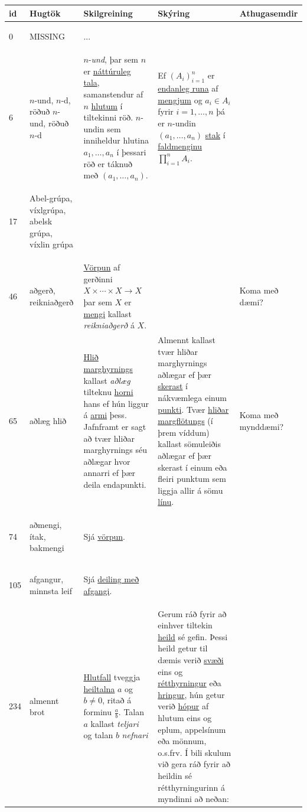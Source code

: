 \begin{longtable}{p{} | p{} | p{} | p{} | p{}}
\hline
\textbf{id} & \textbf{Hugtök} & \textbf{Skilgreining} & \textbf{Skýring} & \textbf{Athugasemdir} \\
\hline
0 & \hypertarget{row:0}{MISSING} & ... &  &  \\
\hline
6 & \hypertarget{row:6}{\(n\)-und, \(n\)-d, röðuð \(n\)-und, röðuð \hbox{\(n\)-d}} & \(n\)-\textit{und}, þar sem \(n\) er \hyperlink{row:3475}{náttúruleg tala}, samanstendur af \(n\) \hyperlink{row:2123}{hlutum} í tiltekinni röð. \(n\)-undin sem inniheldur hlutina \(a_1, \ldots, a_n\) í þessari röð er táknuð með \((a_1, \ldots, a_n)\). & Ef \(\left( A_i \right)_{i=1}^n\) er \hyperlink{row:993}{endanleg runa} af \hyperlink{row:3270}{mengjum} og \(a_i \in A_i\) fyrir \(i=1,\dots,n\) þá er \(n\)-undin \((a_1,\dots,a_n)\) \hyperlink{row:5128}{stak} í \hyperlink{row:3279}{faldmenginu} \(\prod_{i=1}^n A_i\). &  \\
\hline
17 & \hypertarget{row:17}{Abel-grúpa, víxlgrúpa, abelsk grúpa, víxlin grúpa} &  &  &  \\
\hline
46 & \hypertarget{row:46}{aðgerð, reikniaðgerð} & \hyperlink{row:3282}{Vörpun} af gerðinni \(X \times \cdots \times X \to X\) þar sem \(X\) er \hyperlink{row:3270}{mengi} kallast \textit{reikniaðgerð} á \(X\). &  & Koma með dæmi? \\
\hline
65 & \hypertarget{row:65}{aðlæg hlið} & \hyperlink{row:2048}{Hlið} \hyperlink{row:3161}{marghyrnings} kallast \textit{aðlæg} tilteknu \hyperlink{row:2198}{horni} hans ef hún liggur á \hyperlink{row:334}{armi} þess. Jafnframt er sagt að tvær hliðar marghyrnings séu aðlægar hvor annarri ef þær deila endapunkti. & Almennt kallast tvær hliðar marghyrnings aðlægar ef þær \hyperlink{row:4771}{skerast} í nákvæmlega einum \hyperlink{row:4001}{punkti}. Tvær \hyperlink{row:1325}{hliðar} \hyperlink{row:3133}{margflötungs} (í þrem víddum) kallast sömuleiðis aðlægar ef þær skerast í einum eða fleiri punktum sem liggja allir á sömu \hyperlink{row:2911}{línu}. & Koma með mynddæmi? \\
\hline
74 & \hypertarget{row:74}{aðmengi, ítak, bakmengi} & Sjá \hyperlink{row:3282}{vörpun}. &  &  \\
\hline
105 & \hypertarget{row:105}{afgangur, minnsta leif} & Sjá \hyperlink{row:686}{deiling með afgangi}. &  &  \\
\hline
234 & \hypertarget{row:234}{almennt brot} & \hyperlink{row:2072}{Hlutfall} tveggja \hyperlink{row:1896}{heiltalna} \(a\) og \(b \neq 0\), ritað á forminu \(\frac{a}{b}\). Talan \(a\) kallast \textit{teljari} og talan \(b\) \textit{nefnari} & Gerum ráð fyrir að einhver tiltekin \hyperlink{row:1899}{heild} sé gefin. Þessi heild getur til dæmis verið \hyperlink{row:5335}{svæði} eins og \hyperlink{row:4175}{rétthyrningur} eða \hyperlink{row:2295}{hringur}, hún getur verið \hyperlink{row:2196}{hópur} af hlutum eins og eplum, appelsínum eða mönnum, o.s.frv. Í bili skulum við gera ráð fyrir að heildin sé rétthyrningurinn á myndinni að neðan:


\end{longtable}
